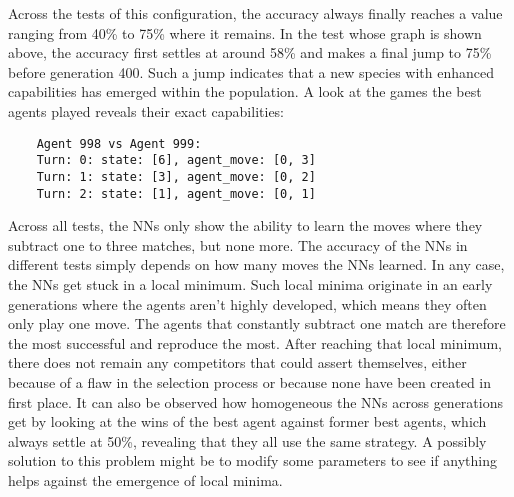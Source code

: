 Across the tests of this configuration, the accuracy always finally reaches a value ranging from 40\% to 75\% where it remains.
In the test whose graph is shown above, the accuracy first settles at around 58\% and makes a final jump to 75\% before generation 400.
Such a jump indicates that a new species with enhanced capabilities has emerged within the population.
A look at the games the best agents played reveals their exact capabilities:
\begin{verbatim}
    Agent 998 vs Agent 999:
    Turn: 0: state: [6], agent_move: [0, 3]
    Turn: 1: state: [3], agent_move: [0, 2]
    Turn: 2: state: [1], agent_move: [0, 1]
\end{verbatim}
Across all tests, the NNs only show the ability to learn the moves where they subtract one to three matches, but none more.
The accuracy of the NNs in different tests simply depends on how many moves the NNs learned.
In any case, the NNs get stuck in a local minimum.
Such local minima originate in an early generations where the agents aren't highly developed, which means they often only play one move.
The agents that constantly subtract one match are therefore the most successful and reproduce the most.
After reaching that local minimum, there does not remain any competitors that could assert themselves, either because of a flaw in the selection process or because none have been created in first place.
It can also be observed how homogeneous the NNs across generations get by looking at the wins of the best agent against former best agents, which always settle at 50\%, revealing that they all use the same strategy.
A possibly solution to this problem might be to modify some parameters to see if anything helps against the emergence of local minima.

